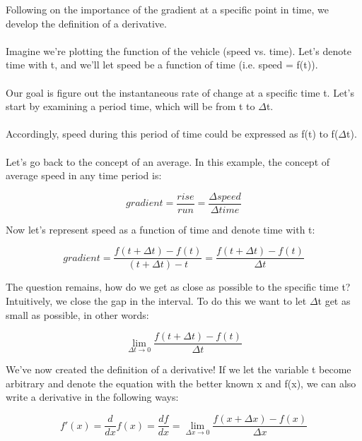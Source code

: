 \documentclass{article}
\begin{document}
Following on the importance of the gradient at a specific point in time, we develop the definition of a derivative.
\\\\
Imagine we're plotting the function of the vehicle (speed vs. time). Let's denote time with t, and we'll let speed be a function of time (i.e. speed = f(t)).
\\\\
Our goal is figure out the instantaneous rate of change at a specific time t. Let's start by examining a period time, which will be from t to $\Delta$t.
\\\\
Accordingly, speed during this period of time could be expressed as f(t) to f($\Delta$t).
\\\\
Let's go back to the concept of an average. In this example, the concept of average speed in any time period is:

\[
gradient = \frac{rise}{run} = \frac{\Delta speed}{\Delta time}
\]

Now let's represent speed as a function of time and denote time with t:

\[
gradient = \frac{f(t + \Delta t) - f(t)}{(t + \Delta t) - t} = \frac{f(t + \Delta t) - f(t)}{\Delta t}
\]

The question remains, how do we get as close as possible to the specific time t? Intuitively, we close the gap in the interval. To do this we want to let $\Delta$t get as small as possible, in other words:

\[
\lim_{\Delta t \to 0} \frac{f(t + \Delta t) - f(t)}{\Delta t}
\]

We've now created the definition of a derivative! If we let the variable t become arbitrary and denote the equation with the better known x and f(x), we can also write a derivative in the following ways:

\[
f'(x) = \frac{d}{dx}f(x) = \frac{df}{dx} = \lim_{\Delta x \to 0} \frac{f(x + \Delta x) - f(x)}{\Delta x}
\]
\end{document}
